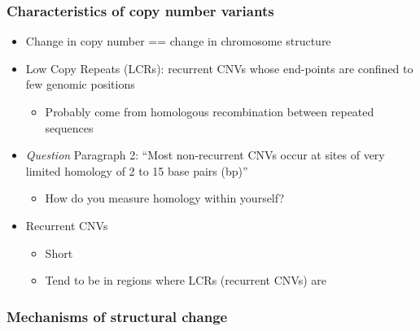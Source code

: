 \documentclass[]{book}
\providecommand{\tightlist}{%
  \setlength{\itemsep}{0pt}\setlength{\parskip}{0pt}}
\begin{document}
\hypertarget{characteristics-of-copy-number-variants}{%
\subsubsection{Characteristics of copy number variants}\label{characteristics-of-copy-number-variants}}

\begin{itemize}
\tightlist
\item
  Change in copy number == change in chromosome structure
\item
  Low Copy Repeats (LCRs): recurrent CNVs whose end-points are confined to few genomic positions

  \begin{itemize}
  \tightlist
  \item
    Probably come from homologous recombination between repeated sequences
  \end{itemize}
\item
  \emph{Question} Paragraph 2: ``Most non-recurrent CNVs occur at sites of very limited homology of 2 to 15 base pairs (bp)''

  \begin{itemize}
  \tightlist
  \item
    How do you measure homology within yourself?
  \end{itemize}
\item
  Recurrent CNVs

  \begin{itemize}
  \tightlist
  \item
    Short
  \item
    Tend to be in regions where LCRs (recurrent CNVs) are
  \end{itemize}
\end{itemize}

\hypertarget{mechanisms-of-structural-change}{%
\subsubsection{Mechanisms of structural change}\label{mechanisms-of-structural-change}}
\end{document}
